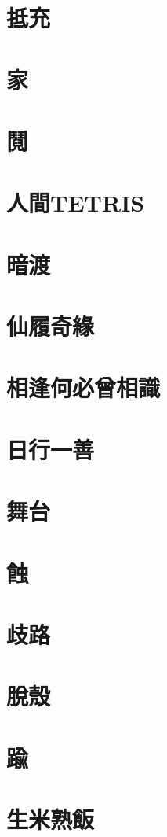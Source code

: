 \documentclass[hyperref]{ctexbook}
\begin{document}
\chapter{抵充}
\chapter{家}
\chapter{鬩}
\chapter{人間TETRIS}
\chapter{暗渡}
\chapter{仙履奇緣}
\chapter{相逢何必曾相識}
\chapter{日行一善}
\chapter{舞台}
\chapter{蝕}
\chapter{歧路}
\chapter{脫殼}
\chapter{踰}
\chapter{生米熟飯}
\end{document}
